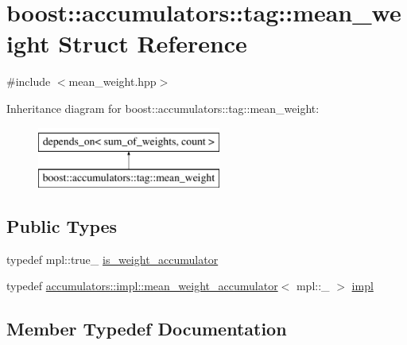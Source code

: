 \hypertarget{structboost_1_1accumulators_1_1tag_1_1mean__weight}{}\section{boost\+:\+:accumulators\+:\+:tag\+:\+:mean\+\_\+weight Struct Reference}
\label{structboost_1_1accumulators_1_1tag_1_1mean__weight}


{\ttfamily \#include $<$mean\+\_\+weight.\+hpp$>$}

Inheritance diagram for boost\+:\+:accumulators\+:\+:tag\+:\+:mean\+\_\+weight\+:\begin{figure}[H]
\begin{center}
\leavevmode
\includegraphics[height=2.000000cm]{structboost_1_1accumulators_1_1tag_1_1mean__weight}
\end{center}
\end{figure}
\subsection*{Public Types}
\begin{DoxyCompactItemize}
\item 
typedef mpl\+::true\+\_\+ \hyperlink{structboost_1_1accumulators_1_1tag_1_1mean__weight_a0eb6a612218600bcc4fd32f08cf9cc70}{is\+\_\+weight\+\_\+accumulator}
\item 
typedef \hyperlink{structboost_1_1accumulators_1_1impl_1_1mean__weight__accumulator}{accumulators\+::impl\+::mean\+\_\+weight\+\_\+accumulator}$<$ mpl\+::\+\_ $>$ \hyperlink{structboost_1_1accumulators_1_1tag_1_1mean__weight_a050aa975e9ff22bae68cb1b2d2ccb5d8}{impl}
\end{DoxyCompactItemize}


\subsection{Member Typedef Documentation}
\hypertarget{structboost_1_1accumulators_1_1tag_1_1mean__weight_a050aa975e9ff22bae68cb1b2d2ccb5d8}{}
